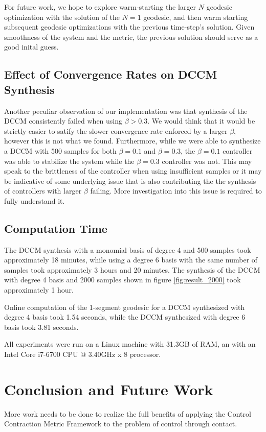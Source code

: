 \documentclass[journal]{IEEEtran}
\begin{document}
For future work, we hope to explore warm-starting the larger $N$ geodesic optimization with the solution of the $N=1$ geodesic, and then warm starting subsequent geodesic optimizations with the previous time-step's solution. Given smoothness of the system and the metric, the previous solution should serve as a good inital guess.

\subsection{Effect of Convergence Rates on DCCM Synthesis}
Another peculiar observation of our implementation was that synthesis of the DCCM consistently failed when using $\beta > 0.3$. We would think that it would be strictly easier to satify the slower convergence rate enforced by a larger $\beta$, however this is not what we found. Furthermore, while we were able to synthesize a DCCM with 500 samples for both $\beta = 0.1$ and $\beta = 0.3$, the $\beta = 0.1$ controller was able to stabilize the system while the $\beta = 0.3$ controller was not. This may speak to the brittleness of the controller when using insufficient samples or it may be indicative of some underlying issue that is also contributing the the synthesis of controllers with larger $\beta$ failing. More investigation into this issue is required to fully understand it.

\subsection{Computation Time}
The DCCM synthesis with a monomial basis of degree 4 and 500 samples took approximately 18 minutes, while using a degree 6 basis with the same number of samples took approximately 3 hours and 20 minutes. The synthesis of the DCCM with degree 4 basis and 2000 samples shown in figure \ref{fig:result_2000} took approximately 1 hour.

Online computation of the 1-segment geodesic for a DCCM synthesized with degree 4 basis took 1.54 seconds, while the DCCM synthesized with degree 6 basis took 3.81 seconds.

All experiments were run on a Linux machine with 31.3GB of RAM, an with an Intel Core i7-6700 CPU @ 3.40GHz x 8 processor.

\section{Conclusion and Future Work}
More work needs to be done to realize the full benefits of applying the Control Contraction Metric Framework to the problem of control through contact. 
\end{document}
